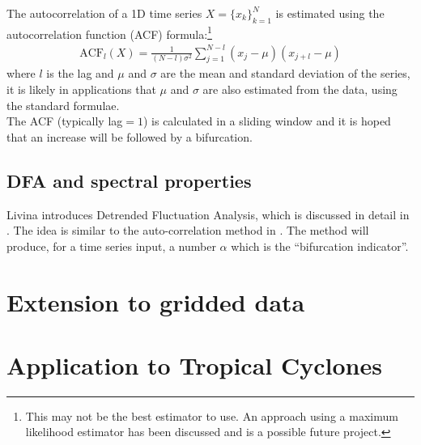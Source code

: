 \documentclass[11pt,a4paper,reqno]{article}
\numberwithin{equation}{section}
\begin{document}
The autocorrelation of a 1D time series $X=\{x_k\}_{k=1}^{N}$ is estimated using the autocorrelation function (ACF) formula:\footnote{This may not be the best estimator to use. An approach using a maximum likelihood estimator has been discussed and is a possible future project.}\marginpar{\large $\star$}
\begin{align}
\text{ACF}_{l}(X) = \frac{1}{(N-l)\sigma^2}\sum_{j=1}^{N-l}(x_{j}-\mu)(x_{j+l} - \mu)
\end{align} 
where $l$ is the lag and $\mu$ and $\sigma$ are the mean and standard deviation of the series, it is likely in applications that $\mu$ and $\sigma$ are also estimated from the data, using the standard formulae. \\

The ACF (typically lag$=1$) is calculated in a sliding window \cite{held2004} and it is hoped that an increase will be followed by a bifurcation.\\

\subsection{DFA and spectral properties}

Livina \cite{livina2007} introduces Detrended Fluctuation Analysis, which is discussed in detail in \cite{kantelhardt2001}. The idea is similar to the auto-correlation method in \cite{held2004}. The method will produce, for a time series input, a number $\alpha$ which is the ``bifurcation indicator''.\\


\section{Extension to gridded data}
\label{sec_gridded}

\section{Application to Tropical Cyclones}
\label{sec_hurricanes}




\newpage

\end{document}
